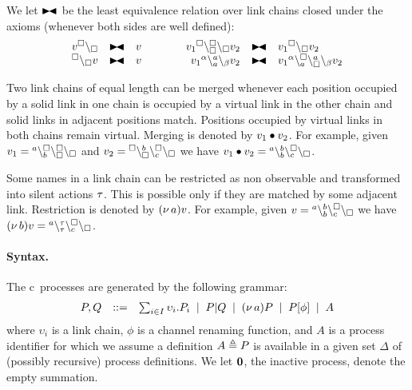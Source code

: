 \begin{definition}\label{def:black}
We let $\blackstretcheq$ be the least equivalence relation 
over link chains closed under the axioms (whenever both sides are well defined):
\[
\begin{array}{rclcrcl}
v\link{\noact}{\noact} & \blackstretcheq &  v & \qquad &
v_1 \startchain{\noact}\chainedlink{\noact}{\noact}\chainend{\noact}v_2 & \blackstretcheq & v_1 \link{\noact}{\noact} v_2\\
\link{\noact}{\noact}v & \blackstretcheq & v & &
v_1 \startchain{\alpha}\chainedlink{a}{a}\chainend{\beta} v_2
& \blackstretcheq & 
v_1 \startchain{\alpha}\chainedlink{a}{\noact}\chainedlink{\noact}{a}\chainend{\beta}v_2 
\end{array}
\]
\end{definition}

Two link chains of equal length can be merged whenever each position occupied by a solid link in one chain is occupied by a virtual link in the other chain and solid links in adjacent positions match. Positions occupied by virtual links in both chains remain virtual. Merging is denoted by $v_1 \bullet v_2$.
%
For example, given $v_1 = {}^{a}\backslash_{b}^{\scriptstyle {\square}}\backslash_{\scriptstyle {\square}}^{\scriptstyle {\square}}\backslash_{\scriptstyle {\square}}$ and $v_2 = {}^{\scriptstyle {\square}}\backslash_{\scriptstyle {\square}}^{b}\backslash_{c}^{\scriptstyle {\square}}\backslash_{\scriptstyle {\square}}$ we have $v_1 \bullet v_2 = {}^{a}\backslash_{b}^{b}\backslash_{c}^{\scriptstyle {\square}}\backslash_{\scriptstyle {\square}}$.

Some names in a link chain can be restricted as non observable and transformed into silent actions $\tau$. This is possible only if they are matched by some adjacent link. Restriction is denoted by $(\nu\, a)v$.
%
For example, given $v = {}^{a}\backslash_{b}^{b}\backslash_{c}^{\scriptstyle {\square}}\backslash_{\scriptstyle {\square}}$ we have 
$(\nu\, b)v = {}^{a}\backslash_{\tau}^{\tau}\backslash_{c}^{\scriptstyle {\square}}\backslash_{\scriptstyle {\square}}$.

\paragraph{Syntax.}
The c\CNA\ processes are generated by the following grammar:
\[
\begin{array}{rcl}
P,Q & ::= &
\sum_{i\in I} \upsilon_i.P_i \;\mid\;
P|Q \;\mid\;
(\nu\, a) P \;\mid\;
P[\phi] \;\mid\;
A
\end{array}
\]
\noindent
where $\upsilon_i$ is a  link chain,
$\phi$ is a channel renaming function,
and $A$ is a process identifier for which we assume a definition $A
\triangleq P$ is available in a given set $\Delta$ of (possibly
recursive) process definitions. We let $\mathbf{0}$, the inactive process,
denote the empty summation.

